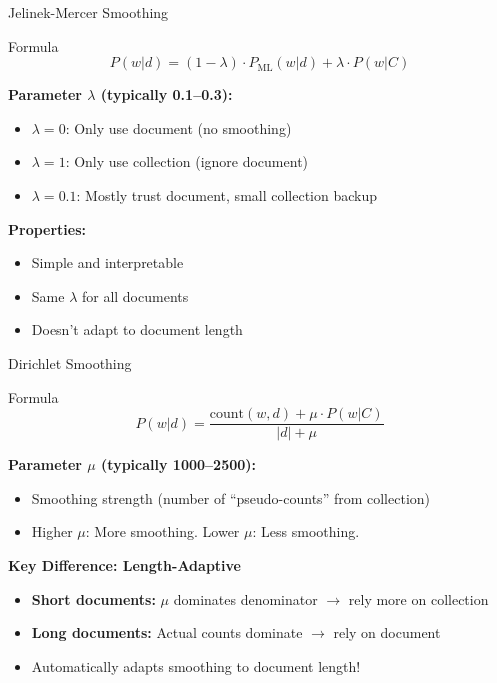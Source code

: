 \documentclass[aspectratio=169]{beamer}
\begin{document}
\begin{frame}[shrink=5]{Jelinek-Mercer Smoothing}
\begin{block}{Formula}
$$P(w|d) = (1-\lambda) \cdot P_{\text{ML}}(w|d) + \lambda \cdot P(w|C)$$
\end{block}

\textbf{Parameter $\lambda$ (typically 0.1--0.3):}
\begin{itemize}
    \item $\lambda = 0$: Only use document (no smoothing)
    \item $\lambda = 1$: Only use collection (ignore document)
    \item $\lambda = 0.1$: Mostly trust document, small collection backup
\end{itemize}

\vspace{1em}

\textbf{Properties:}
\begin{itemize}
    \item \textcolor{green}{\checkmark} Simple and interpretable
    \item \textcolor{green}{\checkmark} Same $\lambda$ for all documents
    \item \textcolor{red}{} Doesn't adapt to document length
\end{itemize}
\end{frame}

\begin{frame}{Dirichlet Smoothing}
\begin{block}{Formula}
$$P(w|d) = \frac{\text{count}(w,d) + \mu \cdot P(w|C)}{|d| + \mu}$$
\end{block}

\textbf{Parameter $\mu$ (typically 1000--2500):}
\begin{itemize}
    \item Smoothing strength (number of ``pseudo-counts'' from collection)
    \item Higher $\mu$: More smoothing. Lower $\mu$: Less smoothing.
\end{itemize}

\vspace{1em}

\textbf{Key Difference: Length-Adaptive}
\begin{itemize}
    \item \textbf{Short documents:} $\mu$ dominates denominator $\rightarrow$ rely more on collection
    \item \textbf{Long documents:} Actual counts dominate $\rightarrow$ rely on document
    \item Automatically adapts smoothing to document length!
\end{itemize}
\end{frame}
\end{document}
